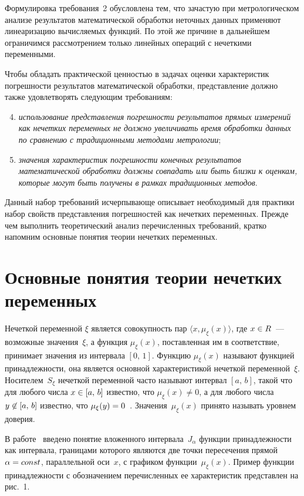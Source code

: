 \begin{multicols}{2}
  Формулировка требования~2 обусловлена тем, что зачастую при 
метрологическом анализе результатов математической обработки неточных 
данных применяют линеаризацию вычисляемых функций. По этой же причине 
в дальнейшем ограничимся рассмотрением только линейных операций с 
нечеткими переменными.
  
  Чтобы обладать практической ценностью в задачах оценки характеристик 
погрешности результатов математической обработки, представление должно 
также удовлетворять следующим требованиям:
  \begin{enumerate}[(1)]
  \setcounter{enumi}{3}
\item \textit{использование представления погрешности результатов прямых 
измерений как нечетких переменных не должно увеличивать время 
обработки данных по сравнению с традиционными методами метрологии};
\item \textit{значения характеристик погрешности конечных результатов 
математической обработки должны совпадать или быть близки к 
оценкам, которые могут быть получены в рамках традиционных методов}.
\end{enumerate}

  Данный набор требований исчерпывающе описывает необходимый для 
практики набор свойств представления погрешностей как нечетких 
переменных. Прежде чем выполнить теоретический анализ перечисленных 
требований, кратко на\-пом\-ним основные понятия теории нечетких переменных.

\section{Основные понятия теории нечетких переменных}

     Нечеткой переменной $\xi$ является совокупность пар $\langle x, 
\mu_\xi(x)\rangle$, где $x\hm\in R$~--- возможные значения~$\xi$, а функция 
$\mu_\xi(x)$, поставленная им в соответствие, принимает значения из 
интервала $[0,\,1]$. Функцию $\mu_\xi(x)$ называют функцией принадлежности, она 
является основной характеристикой нечеткой переменной~$\xi$. 
Носителем~$S_\xi$ нечеткой переменной часто называют интервал $[a,\,b]$, 
такой что для любого числа $x\hm\in [a,\,b]$ известно, что $\mu_\xi(x)\not=0$, а 
для любого числа $y\hm\not\in  [a,\,b]$ известно, что 
$\mu_\xi(y)\hm=0$~\cite{11sem}. Значения~$\mu_\xi(x)$ принято называть 
уровнем доверия. 
  
  В работе~\cite{10sem} введено понятие вложенного интервала~$J_\alpha$ 
функции принадлежности как интервала, границами которого являются две 
точки пересечения прямой $\alpha\hm=const$, параллельной оси~$x$, с 
графиком функции~$\mu_\xi(x)$. Пример функции принадлежности с 
обозначением перечисленных ее характеристик представлен на рис.~1.


\end{multicols}
